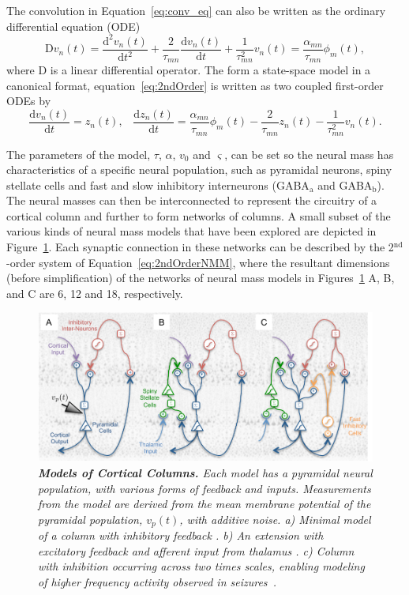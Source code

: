 \documentclass{article}
\begin{document}
The convolution in Equation~\ref{eq:conv_eq} can also be written as the ordinary differential equation (ODE)
\begin{equation}\label{eq:2ndOrder}
    \mathrm{D}v_n(t) = \frac{\mathrm{d}^2 v_n(t)}{\mathrm{d}t^2} + \frac{2}{\tau_{mn}}\frac{\mathrm{d} v_n(t)}{\mathrm{d}t} + \frac{1}{\tau_{mn}^2} v_n(t) = \frac{\alpha_{mn}}{\tau_{mn}} \phi_m(t),
\end{equation}
where $\mathrm{D}$ is a linear differential operator. The form a state-space model in a canonical format, equation~\ref{eq:2ndOrder} is written as two coupled first-order ODEs by 
\begin{equation} \label{eq:2ndOrderNMM}
    \frac{\mathrm{d} v_n(t)}{\mathrm{d}t} = z_n(t),\,\,\,\,\,    \frac{\mathrm{d}z_n(t)}{\mathrm{d}t} = \frac{\alpha_{mn}}{\tau_{mn}} \phi_m(t) - \frac{2}{\tau_{mn}}z_n(t) - \frac{1}{\tau_{mn}^2} v_n(t).
\end{equation}

The parameters of the model, $\tau$, $\alpha$, $v_0$ and $\varsigma$, can be set so the neural mass has characteristics of a specific neural population, such as pyramidal neurons, spiny stellate cells and fast and slow inhibitory interneurons (GABA$_\mathrm{a}$ and GABA$_\mathrm{b}$). The neural masses can then be interconnected to represent the circuitry of a cortical column and further to form networks of columns. A small subset of the various kinds of neural mass models that have been explored \cite{Silva1974,Jansen1995,Wendling2002,David2003} are depicted in Figure~\ref{fig:NMMs}. Each synaptic connection in these networks can be described by the 2$^{\mathrm{nd}}$-order system of Equation~\ref{eq:2ndOrderNMM}, where the resultant dimensions (before simplification) of the networks of neural mass models in Figures~\ref{fig:NMMs} A, B, and C are 6, 12 and 18, respectively.
\begin{figure}[ht]
	\centering
		\includegraphics[scale=1]{./figures/pdf/NeuralMassesHoriz_plos2.pdf}
	\caption{\emph{\textbf{Models of Cortical Columns.} Each model has a pyramidal neural population, with various forms of feedback and inputs. Measurements from the model are derived from the mean membrane potential of the pyramidal population, $v_p(t)$, with additive noise.  a) Minimal model of a column with inhibitory feedback \cite{Silva1974}. b) An extension with excitatory feedback and afferent input from thalamus \cite{Jansen1995,David2003}. c) Column with inhibition occurring across two times scales, enabling modeling of higher frequency activity observed in seizures~\cite{Wendling2002}.}}
	\label{fig:NMMs}
\end{figure}
\end{document}
